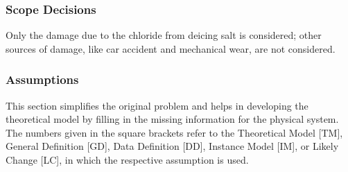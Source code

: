 \documentclass[12pt]{article}
\begin{document}
\subsubsection{Scope Decisions}
Only the damage due to the chloride from deicing salt is considered; other sources of damage, like car accident and mechanical wear, are not considered.

\subsubsection{Assumptions} \label{sec_assumpt}

This section simplifies the original problem and helps in developing the
theoretical model by filling in the missing information for the physical system.
The numbers given in the square brackets refer to the Theoretical Model [TM],
General Definition [GD], Data Definition [DD], Instance Model [IM], or Likely
Change [LC], in which the respective assumption is used.
\end{document}
